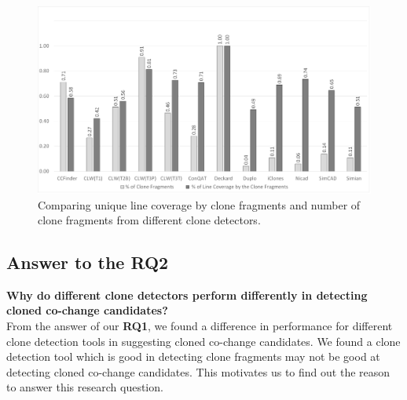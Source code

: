 \documentclass[review]{elsarticle}
\begin{document}
\vspace{2mm}
\begin{figure}
\centering
\includegraphics[width=\textwidth] {AverageLineCoveredPerSS.png}
\caption{Comparing unique line coverage by clone fragments and number of clone fragments from different clone detectors.}
\label{fig:AverageLineCoveredPerSS}
\end{figure}
\subsection{Answer to the \textbf{RQ2}}
\textbf{Why do different clone detectors perform differently in detecting cloned co-change candidates?} \\

From the answer of our \textbf{RQ1}, we found a difference in performance for different clone detection tools in suggesting cloned co-change candidates. We found a clone detection tool which is good in detecting clone fragments may not be good at detecting cloned co-change candidates. This motivates us to find out the reason to answer this research question. 
\end{document}
